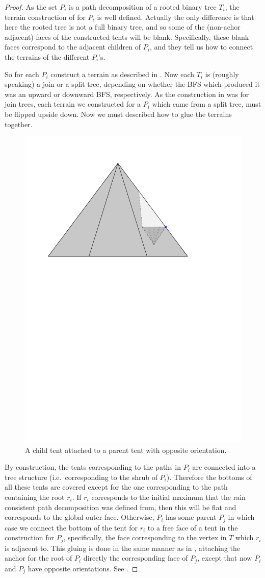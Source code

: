 {\begin{proof}
 As the set $P_i$ is a path decomposition of a rooted binary tree $T_i$, the terrain construction of  for $P_i$ is well defined.  
 Actually the only difference is that here the rooted tree is not a full binary tree, and so some of the (non-achor adjacent) faces of the constructed tents will be blank.  
 Specifically, these blank faces correspond to the adjacent children of $P_i$, and they tell us how to connect the terrains of the different $P_i$'s.
 
 So for each $P_i$ construct a terrain as described in .  Now each $T_i$ is (roughly speaking) a join or a split tree, depending on 
 whether the BFS which produced it was an upward or downward BFS, respectively.  As the construction in  was for join trees, each terrain 
 we constructed for a $P_i$ which came from a split tree, must be flipped upside down.
 Now we must described how to glue the terrains together.
  
 \begin{figure}[h]\centering
    \includegraphics[width=.28\linewidth]{figs/cones2}
    \caption{A child tent attached to a parent tent with opposite orientation.}
    \label{fig:diamond2}
\end{figure} 
  
 By construction, the tents corresponding to the paths in $P_i$ are connected 
 into a tree structure (i.e.\ corresponding to the shrub of $P_i$).  Therefore the bottoms of all these tents are covered except for the one corresponding 
 to the path containing the root $r_i$.  
 If $r_i$ corresponds to the initial maximum that the rain consistent path decomposition was defined from, then this will be flat and corresponds to the global outer face.
 Otherwise, $P_i$ has some parent $P_j$ in which case we connect the bottom of the tent for $r_i$ to a free face of a tent in the construction for $P_j$, specifically, the face corresponding to the 
 vertex in $T$ which $r_i$ is adjacent to. This gluing is done in the same manner as in , attaching the anchor for the root of $P_i$ directly the corresponding face of $P_j$, except that now $P_i$ and $P_j$ have opposite orientations.  See .
 

\end{proof}}
